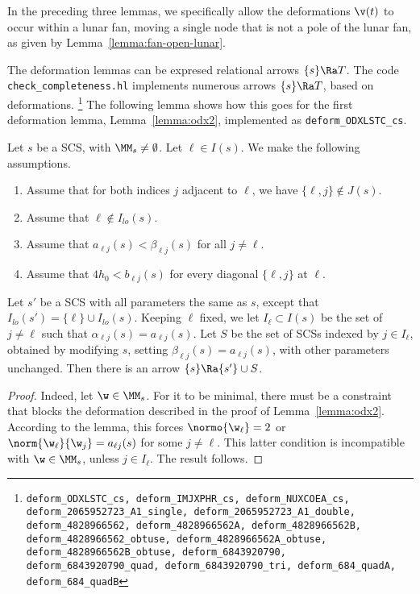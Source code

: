 In the preceding three lemmas, we specifically allow the deformations
$\v(t)$ to occur within a lunar fan, moving a single node that is not a pole
of the lunar fan, as given by Lemma~\ref{lemma:fan-open-lunar}.

The deformation lemmas can be expresed relational
arrows $\{s\}\Ra T$.  The code {\tt check\_completeness.hl} implements
numerous arrows $\{s\}\Ra T$, based on deformations.%
\footnote{\tt deform\_ODXLSTC\_cs,
deform\_IMJXPHR\_cs,
deform\_NUXCOEA\_cs,
deform\_2065952723\_A1\_single,
deform\_2065952723\_A1\_double,
deform\_4828966562,
deform\_4828966562A,
deform\_4828966562B,
deform\_4828966562\_obtuse,
deform\_4828966562A\_obtuse,
deform\_4828966562B\_obtuse,
deform\_6843920790,
deform\_6843920790\_quad,
deform\_6843920790\_tri,
deform\_684\_quadA,
deform\_684\_quadB}
The following lemma shows how this goes
for the first deformation lemma, Lemma~\ref{lemma:odx2}, implemented as
{\tt deform\_ODXLSTC\_cs}.

\begin{lemma}  
Let $s$ be a SCS, with $\MM_s\ne\emptyset$.  Let $\ell\in I(s)$.
We make the following assumptions.
\begin{enumerate}
\item Assume that for both indices $j$ adjacent to $\ell$, we have $\{\ell,j\}\not\in
J(s)$.
\item Assume that $\ell\not\in I_{lo}(s)$.
\item Assume that  $a_{\ell j}(s)<\beta_{\ell j}(s)$ for all $j\ne \ell$.
\item
Assume that $4h_0 < b_{\ell j}(s)$ for every diagonal $\{\ell,j\}$ at
$\ell$.  
\end{enumerate}
Let $s'$ be a SCS with all parameters
the same as $s$, except that $I_{lo}(s') = \{\ell\}\cup I_{lo}(s)$.
Keeping $\ell$ fixed, we
let $I_\ell\subset I(s)$ be the set of $j\ne \ell$ such that 
$\alpha_{\ell j}(s)=a_{\ell j}(s)$. 
Let $S$ be the set of SCSs indexed by $j\in
I_\ell$,
obtained by
modifying $s$, setting $\beta_{\ell j}(s)=a_{\ell j}(s)$, with other
parameters unchanged.
Then there is an arrow $\{s\}\Ra \{s'\}\cup S$.  
\end{lemma}

\begin{proof}
Indeed, let
$\w\in \MM_s$.  For it to be minimal, there must be a constraint
that blocks the  deformation described in the proof of
Lemma~\ref{lemma:odx2}.
According to the lemma, this forces $\normo{\w_\ell}=2$ or
$\norm{\w_\ell}{\w_j}=a_{\ell j}(s)$ for some $j\ne \ell$.  This latter
condition
is incompatible with $\w\in \MM_s$, unless $j\in I_\ell$.  The result
follows.
\end{proof}


